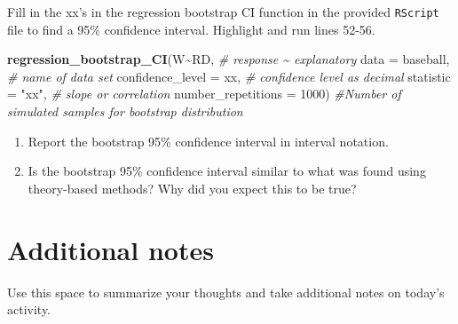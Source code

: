 \documentclass[
]{report}
\newenvironment{Shaded}{\begin{snugshade}}{\end{snugshade}}
\newcommand{\CommentTok}[1]{\textcolor[rgb]{0.56,0.35,0.01}{\textit{#1}}}
\newcommand{\DataTypeTok}[1]{\textcolor[rgb]{0.13,0.29,0.53}{#1}}
\newcommand{\DecValTok}[1]{\textcolor[rgb]{0.00,0.00,0.81}{#1}}
\newcommand{\KeywordTok}[1]{\textcolor[rgb]{0.13,0.29,0.53}{\textbf{#1}}}
\newcommand{\NormalTok}[1]{#1}
\newcommand{\OperatorTok}[1]{\textcolor[rgb]{0.81,0.36,0.00}{\textbf{#1}}}
\newcommand{\StringTok}[1]{\textcolor[rgb]{0.31,0.60,0.02}{#1}}
\begin{document}
\vspace{0.5in}

Fill in the xx's in the regression bootstrap CI function in the provided \texttt{RScript} file to find a 95\% confidence interval. Highlight and run lines 52-56.

\begin{Shaded}
\begin{Highlighting}[]
\KeywordTok{regression\_bootstrap\_CI}\NormalTok{(W}\OperatorTok{\textasciitilde{}}\NormalTok{RD, }\CommentTok{\# response \textasciitilde{} explanatory}
                        \DataTypeTok{data =}\NormalTok{ baseball, }\CommentTok{\# name of data set}
                        \DataTypeTok{confidence\_level =}\NormalTok{ xx, }\CommentTok{\# confidence level as decimal}
                        \DataTypeTok{statistic =} \StringTok{"xx"}\NormalTok{, }\CommentTok{\# slope or correlation}
                        \DataTypeTok{number\_repetitions =} \DecValTok{1000}\NormalTok{) }\CommentTok{\#Number of simulated samples for bootstrap distribution}
\end{Highlighting}
\end{Shaded}

\begin{enumerate}
\def\labelenumi{\arabic{enumi}.}
\setcounter{enumi}{3}
\item
  Report the bootstrap 95\% confidence interval in interval notation.\\
  \vspace{0.5in}
\item
  Is the bootstrap 95\% confidence interval similar to what was found using theory-based methods? Why did you expect this to be true?
\end{enumerate}

\vspace{1in}

\hypertarget{additional-notes}{%
\section{Additional notes}\label{additional-notes}}

Use this space to summarize your thoughts and take additional notes on today's activity.
\end{document}
